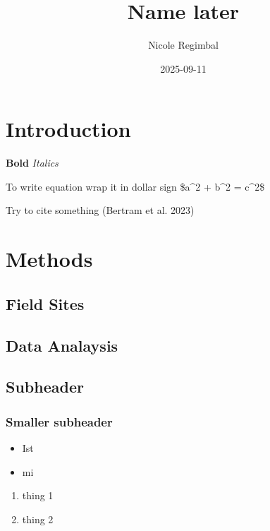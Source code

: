 \documentclass[
]{article}
\title{Name later}
\author{Nicole Regimbal}
\date{2025-09-11}
\providecommand{\tightlist}{%
  \setlength{\itemsep}{0pt}\setlength{\parskip}{0pt}}
\begin{document}
\maketitle

\hypertarget{introduction}{%
\section{Introduction}\label{introduction}}

\textbf{Bold} \emph{Italics}

To write equation wrap it in dollar sign \$a\^{}2 + b\^{}2 = c\^{}2\$

Try to cite something (Bertram et al. 2023)

\hypertarget{methods}{%
\section{Methods}\label{methods}}

\hypertarget{field-sites}{%
\subsection{Field Sites}\label{field-sites}}

\hypertarget{data-analaysis}{%
\subsection{Data Analaysis}\label{data-analaysis}}

\hypertarget{subheader}{%
\subsection{Subheader}\label{subheader}}

\hypertarget{smaller-subheader}{%
\subsubsection{Smaller subheader}\label{smaller-subheader}}

\begin{itemize}
\tightlist
\item
  Ist
\item
  mi
\end{itemize}

\begin{enumerate}
\def\labelenumi{\arabic{enumi}.}
\tightlist
\item
  thing 1
\item
  thing 2
\end{enumerate}
\end{document}
